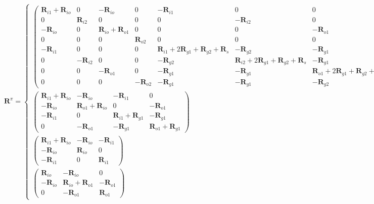 \begin{equation}
\label{eqn:heat_exchange_term_R}
\bm{R}^\pi = \left\{ \begin{array}{ll}
\left( \begin{array}{cccccccc}
\bm{R}_{i1} + \bm{R}_{io} & 0 & -\bm{R}_{io} & 0 & -\bm{R}_{i1} & 0 & 0 & 0 \\
0 & \bm{R}_{i2} & 0 & 0 & 0 & -\bm{R}_{i2} & 0 & 0 \\
-\bm{R}_{io} & 0 & \bm{R}_{io} + \bm{R}_{o1} & 0 & 0 & 0 & -\bm{R}_{o1} & 0 \\
0 & 0 & 0 & \bm{R}_{o2} & 0 & 0 & 0 & -\bm{R}_{o2} \\
-\bm{R}_{i1} & 0 & 0 & 0 & \bm{R}_{i1}+2\bm{R}_{g1}+\bm{R}_{g2}+\bm{R}_{s} & -\bm{R}_{g2} & -\bm{R}_{g1} & -\bm{R}_{g1} \\
0 & -\bm{R}_{i2} & 0 & 0 & -\bm{R}_{g2} & \bm{R}_{i2}+2\bm{R}_{g1}+\bm{R}_{g2}+\bm{R}_{s} & -\bm{R}_{g1} & -\bm{R}_{g1} \\
0 & 0 & -\bm{R}_{o1} & 0 & -\bm{R}_{g1} & -\bm{R}_{g1} & \bm{R}_{o1}+2\bm{R}_{g1}+\bm{R}_{g2}+\bm{R}_{s} & 0 \\
0 & 0 & 0 & -\bm{R}_{o2} & -\bm{R}_{g1} & -\bm{R}_{g1} & -\bm{R}_{g2} & \bm{R}_{o2}+2\bm{R}_{g1}+\bm{R}_{g2}+\bm{R}_{s} \end{array} \right)
  & \mbox{2U} \\
\left( \begin{array}{cccc}
\bm{R}_{i1}+\bm{R}_{io} & -\bm{R}_{io} & -\bm{R}_{i1} & 0  \\
-\bm{R}_{io} & \bm{R}_{o1}+\bm{R}_{io} & 0 & -\bm{R}_{o1}  \\
-\bm{R}_{i1} & 0 & \bm{R}_{i1}+\bm{R}_{g1} & -\bm{R}_{g1}  \\
0 & -\bm{R}_{o1} & -\bm{R}_{g1} & \bm{R}_{o1}+\bm{R}_{g1}  \end{array} \right)
 & \mbox{1U} \\
\left( \begin{array}{ccc}
\bm{R}_{i1}+\bm{R}_{io} & -\bm{R}_{io} & -\bm{R}_{i1}  \\
-\bm{R}_{io} & \bm{R}_{io} & 0  \\
-\bm{R}_{i1} & 0 & \bm{R}_{i1}  \end{array} \right)
 & \mbox{CXA} \\
\left( \begin{array}{ccc}
\bm{R}_{io} & -\bm{R}_{io} & 0  \\
-\bm{R}_{io} & \bm{R}_{io}+\bm{R}_{o1} & -\bm{R}_{o1}  \\
0 & -\bm{R}_{o1} & \bm{R}_{o1}  \end{array} \right)
 & \mbox{CXA} 
       \end{array} \right.
\end{equation}
